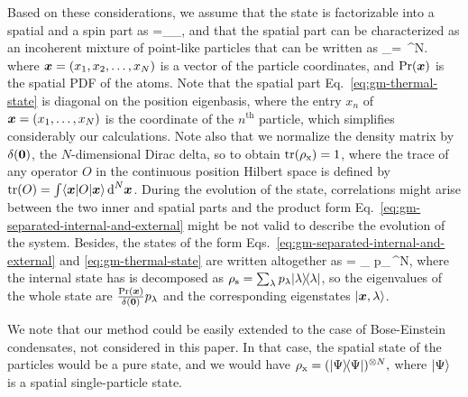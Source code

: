 Based on these considerations, we assume that the state is factorizable into a spatial and a spin part as
\be
\label{eq:gm-separated-internal-and-external}
\rho=\rho_{}\otimes\rho_{},
\ee
and that the spatial part can be characterized as an incoherent mixture of point-like particles that can be written as
\be
  \label{eq:gm-thermal-state}
  \rho_{}=\int {} \,^N.
\ee
where $\boldsymbol{x}=(x_1,x_2,\dots,x_N)$ is a vector of the particle coordinates, and $\text{Pr}(\boldsymbol{x})$ is the spatial PDF of the atoms.
Note that the spatial part Eq.~\eqref{eq:gm-thermal-state} is diagonal on the position eigenbasis, where the entry $x_n$ of $\boldsymbol{x} =(x_1,\dots,x_N)$ is the coordinate of the $n^{\text{th}}$ particle, which simplifies considerably our calculations.
Note also that we normalize the density matrix by $\delta(\boldsymbol{0})$, the $N$-dimensional Dirac delta, so to obtain $\operatorname{tr}(\rho_{\text{x}})=1$, where the trace of any operator $O$ in the continuous position Hilbert space is defined by $\operatorname{tr}(O)=\int \langle{\ensuremath{\boldsymbol{x}}}\vert{O}\vert{\ensuremath{\boldsymbol{x}}}\rangle\,\text{d}^N\boldsymbol{x}$.
During the evolution of the state, correlations might arise between the two inner and spatial parts and the product form Eq.~\eqref{eq:gm-separated-internal-and-external} might be not valid to describe the evolution of the system.
Besides, the states of the form Eqs.~\eqref{eq:gm-separated-internal-and-external} and \eqref{eq:gm-thermal-state} are written altogether as
\be
  \rho = \int \sum_{\lambda} p_\lambda {}\,^N,
  \label{eq:gm-eigendecomposition-of-state}
\ee
where the internal state has is decomposed as $\rho_{\text{s}}=\sum_{\lambda}p_\lambda\vert{\lambda}\rangle{\!}\langle{\lambda}\vert$, so the eigenvalues of the whole state are $\frac{\text{Pr}(\boldsymbol{x})}{\delta(\boldsymbol{0})}p_\lambda$ and the corresponding eigenstates $\vert{\ensuremath{\boldsymbol{x}},\lambda}\rangle$.

We note that our method could be easily extended to the case of Bose-Einstein condensates, not considered in this paper. In that case, the spatial state of the particles would be a pure state, and we would have $\rho_{\text{x}}=(\vert{\Psi}\rangle{\!}\langle{\Psi}\vert)^{\otimes N},$ where $\vert{\Psi}\rangle$ is a spatial single-particle state.

